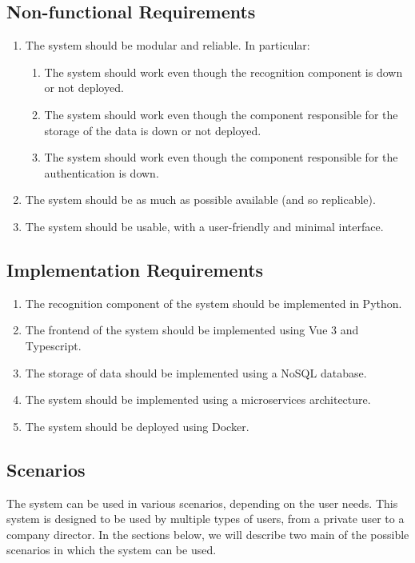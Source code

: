 \documentclass{scrartcl}
\begin{document}
    \subsection{Non-functional Requirements}\label{subsec:non-functional-requirements}
    \begin{enumerate}
        \item \label{itm:non-func-1} The system should be modular and reliable. In particular:
        \begin{enumerate}
            \item The system should work even though the recognition component is down or not deployed.
            \item The system should work even though the component responsible for the storage of the data is down or not deployed.
            \item The system should work even though the component responsible for the authentication is down.
        \end{enumerate}
        \item \label{itm:non-func-2} The system should be as much as possible available (and so replicable).
        \item \label{itm:non-func-3} The system should be usable, with a user-friendly and minimal interface.
    \end{enumerate}

    \subsection{Implementation Requirements}\label{subsec:implementation-requirements}
    \begin{enumerate}
        \item \label{itm:impl-1} The recognition component of the system should be implemented in Python.
        \item \label{itm:impl-2} The frontend of the system should be implemented using Vue 3 and Typescript.
        \item \label{itm:impl-3} The storage of data should be implemented using a NoSQL database.
        \item \label{itm:impl-4} The system should be implemented using a microservices architecture.
        \item \label{itm:impl-5} The system should be deployed using Docker.
    \end{enumerate}

    \subsection{Scenarios}
    The system can be used in various scenarios, depending on the user needs.
    This system is designed to be used by multiple types of users, from a private user to a company director.
    In the sections below, we will describe two main of the possible scenarios in which the system can be used.
\end{document}
